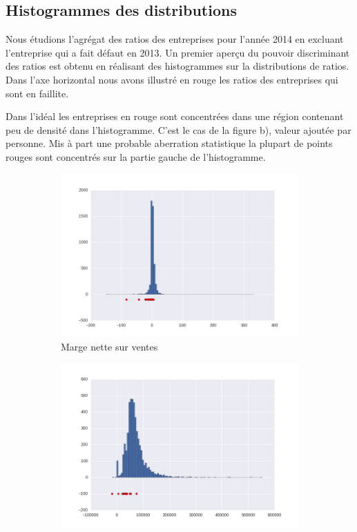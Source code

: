 \documentclass[DIV=calc, paper=a4, fontsize=11pt, twocolumn]{scrartcl}
\begin{document}
\begin{appendices}
\onecolumn
\section{Histogrammes des distributions}
Nous étudions l'agrégat des ratios des entreprises pour l'année 2014 en excluant l'entreprise qui a fait défaut en 2013. Un premier aperçu du pouvoir discriminant des ratios est obtenu en réalisant des histogrammes sur la distributions de ratios. Dans l'axe horizontal nous avons illustré en rouge les ratios des entreprises qui sont en faillite.

Dans l'idéal les entreprises en rouge sont concentrées dans une région contenant peu de densité dans l'histogramme. C'est le cas de la figure b), valeur ajoutée par personne. Mis à part une probable aberration statistique la plupart de points rouges sont concentrés sur la partie gauche de l'histogramme.
\begin{figure}[H]
\centering
\captionsetup[subfigure]{labelformat=empty}
  \begin{subfigure}{.45\textwidth}
    \centering
    \includegraphics[width=\linewidth]{r2.png}
    \caption{Marge nette sur ventes}
  \end{subfigure}
  \begin{subfigure}{.45\textwidth}
    \centering
    \includegraphics[width=\linewidth]{r4.png}

\end{subfigure}
\end{figure}
\end{appendices}
\end{document}
